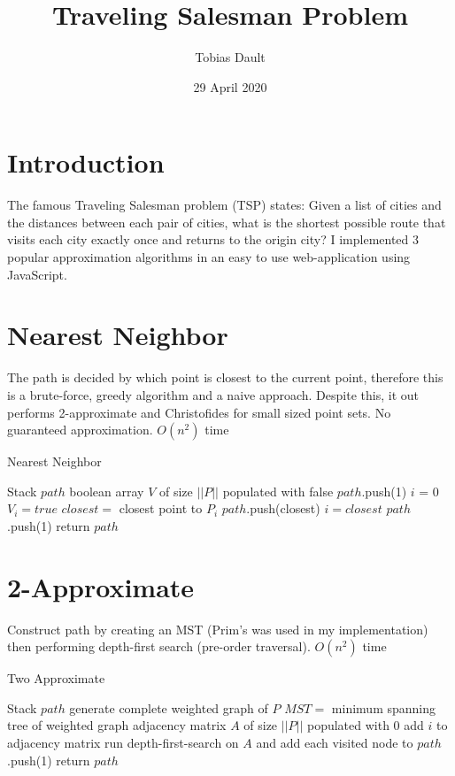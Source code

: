 \documentclass[11pt]{article}
\title{\textbf{Traveling Salesman Problem}}
\author{Tobias Dault}
\date{29 April 2020}
\begin{document}
\maketitle
\thispagestyle{empty}

\section{Introduction}
The famous Traveling Salesman problem (TSP) states: Given a list of cities and the distances between each pair of cities, what is the shortest possible route that visits each city exactly once and returns to the origin city? I implemented 3 popular approximation algorithms in an easy to use web-application using JavaScript.


\section{Nearest Neighbor}
The path is decided by which point is closest to the current point, therefore this is a brute-force, greedy algorithm and a naive approach. Despite this, it out performs 2-approximate and Christofides for small sized point sets. No guaranteed approximation. $O(n^2)$ time
\begin{algorithm}
	\caption{Nearest Neighbor}
	\begin{algorithmic}
		\State Stack $path$
		\State boolean array $V$ of size $||P||$ populated with false
		\State $path$.push(1)
		\State $i$ = 0
		\State $V_i = true$
		\State $closest =$ closest point to $P_i$
		\State $path$.push(closest)
		\State $i = closest$
		\EndWhile
		\State $path$.push(1)
		\State return $path$
		\EndFunction
		
	\end{algorithmic}
\end{algorithm}
\newpage
\section{2-Approximate}
Construct path by creating an MST (Prim's was used in my implementation) then performing depth-first search (pre-order traversal). $O(n^2)$ time
\begin{algorithm}
	\caption{Two Approximate}
	\begin{algorithmic}
		\Function{Two-Approximate}{P}
		\State Stack $path$
		\State generate complete weighted graph of $P$
		\State $MST =$ minimum spanning tree of weighted graph
		\State adjacency matrix $A$ of size $||P||$ populated with 0
		\For{$i$ in $MST$}
		\State add $i$ to adjacency matrix
		\EndFor
		\State run depth-first-search on $A$ and add each visited node to \State $path$.push(1)
		\State return $path$
		
		\EndFunction
	\end{algorithmic}
\end{algorithm}
\end{document}
